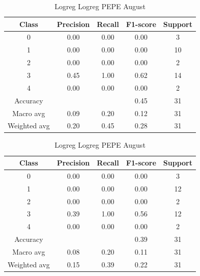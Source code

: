\begin{enumerate}
\begin{enumerate}
                \begin{table}[H]
                \centering
                \scriptsize
                \begin{minipage}{0.48\textwidth}
                \centering
                \begin{tabular}{c|cccc}
                \hline
                Class & Precision & Recall & F1-score & Support \\
                \hline
                0 & 0.00 & 0.00 & 0.00 & 3 \\
                1 & 0.00 & 0.00 & 0.00 & 10 \\
                2 & 0.00 & 0.00 & 0.00 & 2 \\
                3 & 0.45 & 1.00 & 0.62 & 14 \\
                4 & 0.00 & 0.00 & 0.00 & 2 \\
                \hline
                Accuracy &       &      & 0.45 & 31 \\
                Macro avg & 0.09 & 0.20 & 0.12 & 31 \\
                Weighted avg & 0.20 & 0.45 & 0.28 & 31 \\
                \hline
                \end{tabular}
                \caption{Logreg Logreg DOGE August}
                \label{tab:classifier_2_report_logreg_logreg_doge_non_filtered_aug}
                \end{minipage}
                \hfill
                \begin{minipage}{0.48\textwidth}
                \centering
                \begin{tabular}{c|cccc}
                \hline
                Class & Precision & Recall & F1-score & Support \\
                \hline
                0 & 0.00 & 0.00 & 0.00 & 3 \\
                1 & 0.00 & 0.00 & 0.00 & 12 \\
                2 & 0.00 & 0.00 & 0.00 & 2 \\
                3 & 0.39 & 1.00 & 0.56 & 12 \\
                4 & 0.00 & 0.00 & 0.00 & 2 \\
                \hline
                Accuracy &       &      & 0.39 & 31 \\
                Macro avg & 0.08 & 0.20 & 0.11 & 31 \\
                Weighted avg & 0.15 & 0.39 & 0.22 & 31 \\
                \hline
                \end{tabular}
                \caption{Logreg Logreg PEPE August}
                \label{tab:classifier_2_report_logreg_logreg_pepe_non_filtered_aug}
                \end{minipage}
                

\end{table}
\end{enumerate}
\end{enumerate}
